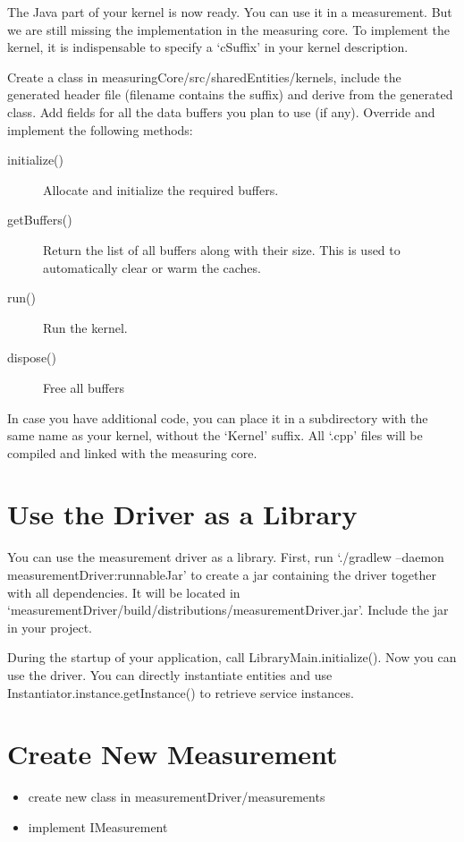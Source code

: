 \documentclass[a4paper,12pt]{report}
\newcommand{\method}[1]{\textsf{#1}}
\begin{document}
The Java part of your kernel is now ready. You can use it in a measurement. But
we are still missing the implementation in the measuring core. To implement the
kernel, it is indispensable to specify a `cSuffix' in your kernel description.

Create a class in measuringCore/src/sharedEntities/kernels, include the
generated header file (filename contains the suffix) and derive from the
generated class. Add fields for all the data buffers you plan to use
(if any). Override and implement the following methods:
\begin{description}
\item[\method{initialize()}] Allocate and initialize the required buffers.
\item[\method{getBuffers()}] Return the list of all buffers along with their
size. This is used to automatically clear or warm the caches.
\item[\method{run()}] Run the kernel.
\item[\method{dispose()}] Free all buffers
\end{description}

In case you have additional code, you can place it in a subdirectory with the
same name as your kernel, without the `Kernel' suffix. All `.cpp' files will be
compiled and linked with the measuring core.

\section{Use the Driver as a Library}
You can use the measurement driver as a library. First, run `./gradlew
--daemon measurementDriver:runnableJar' to create a jar containing the driver
together with all dependencies. It will be located in
`measurementDriver/build/distributions/measurementDriver.jar'. Include the jar
in your project.

During the startup of your application, call LibraryMain.initialize(). Now you
can use the driver. You can directly instantiate entities and use
\method{Instantiator.instance.getInstance()} to retrieve service instances.

\section{Create New Measurement}
\begin{itemize}
\item create new class in measurementDriver/measurements
\item implement IMeasurement
\end{itemize}
\end{document}

